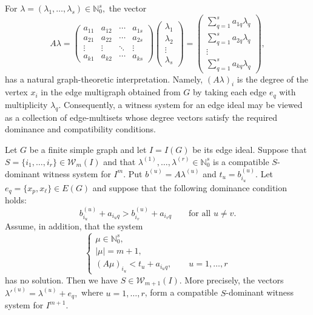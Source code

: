 \documentclass[11pt]{amsart}   %
\begin{document}
For $\lambda=(\lambda_1,\ldots,\lambda_s)\in\mathbb N_0^s,$  the vector
\[ A\lambda = \begin{pmatrix} a_{11} & a_{12} & \cdots & a_{1s}\\ a_{21} & a_{22} & \cdots & a_{2s}\\ \vdots & \vdots & \ddots & \vdots\\ a_{k1} & a_{k2} & \cdots & a_{ks} \end{pmatrix} \begin{pmatrix} \lambda_1\\ \lambda_2\\ \vdots\\ \lambda_s \end{pmatrix} = \begin{pmatrix} \displaystyle\sum_{q=1}^s a_{1q}\lambda_q\\ \displaystyle\sum_{q=1}^s a_{2q}\lambda_q\\ \vdots\\ \displaystyle\sum_{q=1}^s a_{kq}\lambda_q \end{pmatrix},\]
 has a natural graph-theoretic interpretation. Namely,
 $(A\lambda)_i$  is the degree of the vertex \(x_i\) in the edge multigraph obtained
from \(G\) by taking each edge \(e_q\) with multiplicity \(\lambda_q\).
Consequently, a witness system for an edge ideal may be viewed as a
collection of edge-multisets whose degree vectors satisfy the required
dominance and compatibility conditions.


\begin{prop} \label{prop:edge_extension}
Let \(G\) be a finite simple graph and let \(I=I(G)\) be its edge ideal. Suppose that
$S=\{i_1,\ldots,i_r\}\in\mathcal W_m(I)$ and that $\lambda^{(1)},\ldots,\lambda^{(r)}\in\mathbb N_0^s$
is a compatible \(S\)-dominant witness system for \(I^m\). Put $b^{(u)}=A\lambda^{(u)}$ and
$t_u=b^{(u)}_{i_u}.$   Let  $e_q=\{x_p,x_\ell\}\in E(G)$ and suppose that the following dominance condition holds:
\begin{equation}
b^{(u)}_{i_u}+a_{i_uq}
>
b^{(u)}_{i_v}+a_{i_vq}
\qquad
\text{for all }u\neq v.
\tag{G1}
\label{eq:edge_extension_dominance}
\end{equation}
Assume, in addition, that the system
\begin{equation}
\begin{cases}
\mu\in\mathbb N_0^s,\\
|\mu|=m+1,\\
(A\mu)_{i_u}<t_u+a_{i_uq},
\qquad u=1,\ldots,r
\end{cases}
\tag{G2}
\label{eq:edge_extension_escape}
\end{equation}
has no solution. Then we have $S\in\mathcal W_{m+1}(I).$ More precisely, the vectors
 $\lambda'^{(u)}=\lambda^{(u)}+e_q,$ where  $u=1,\ldots,r$,  form a compatible \(S\)-dominant witness system for \(I^{m+1}\).
\end{prop}
\end{document}

